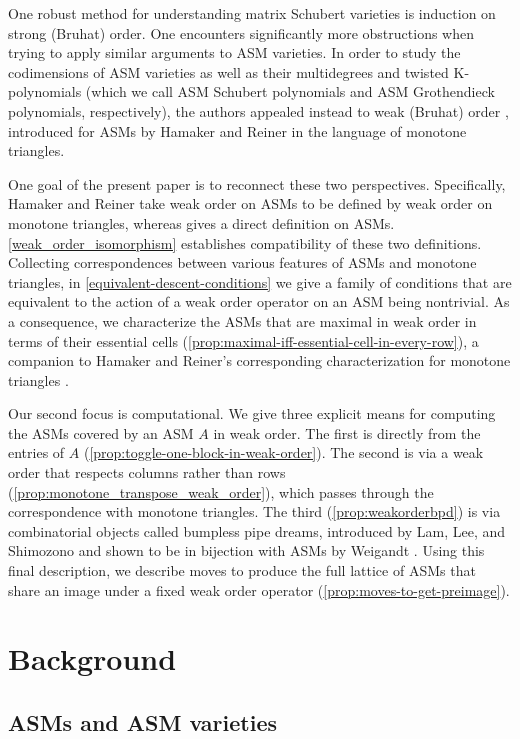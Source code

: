 \documentclass[12 pt]{amsart}
\numberwithin{equation}{section}
\theoremstyle{remark}
\begin{document}
One robust method for understanding matrix Schubert varieties is induction on strong (Bruhat) order.  One encounters significantly more obstructions when trying to apply similar arguments to ASM varieties.  In order to study the codimensions of ASM varieties as well as their multidegrees and twisted K-polynomials (which we call ASM Schubert polynomials and ASM Grothendieck polynomials, respectively), the authors appealed instead to weak (Bruhat) order \cite{EKW-main}, introduced for ASMs by Hamaker and Reiner \cite{HR20} in the language of monotone triangles.  

One goal of the present paper is to reconnect these two perspectives. Specifically, Hamaker and Reiner take weak order on ASMs to be defined by weak order on monotone triangles, whereas \cite{EKW-main} gives a direct definition on ASMs. \cref{weak_order_isomorphism} establishes compatibility of these two definitions. Collecting correspondences between various features of ASMs and monotone triangles, in \cref{equivalent-descent-conditions} we give a family of conditions that are equivalent to the action of a weak order operator on an ASM being nontrivial. As a consequence, we characterize the ASMs that are maximal in weak order in terms of their essential cells (\cref{prop:maximal-iff-essential-cell-in-every-row}), a companion to Hamaker and Reiner's corresponding characterization for monotone triangles \cite[Lemma 6.2]{HR20}.

Our second focus is computational. We give three explicit means for computing the ASMs covered by an ASM $A$ in weak order. The first is directly from the entries of $A$ (\cref{prop:toggle-one-block-in-weak-order}). The second is via a weak order that respects columns rather than rows (\cref{prop:monotone_transpose_weak_order}), which passes through the correspondence with monotone triangles. The third (\cref{prop:weakorderbpd}) is via combinatorial objects called bumpless pipe dreams, introduced by Lam, Lee, and Shimozono \cite{LLS21} and shown to be in bijection with ASMs by Weigandt \cite{Wei21}. Using this final description, we describe moves to produce the full lattice of ASMs that share an image under a fixed weak order operator (\cref{prop:moves-to-get-preimage}).

\section{Background}

\subsection{ASMs and ASM varieties} 
\end{document}
